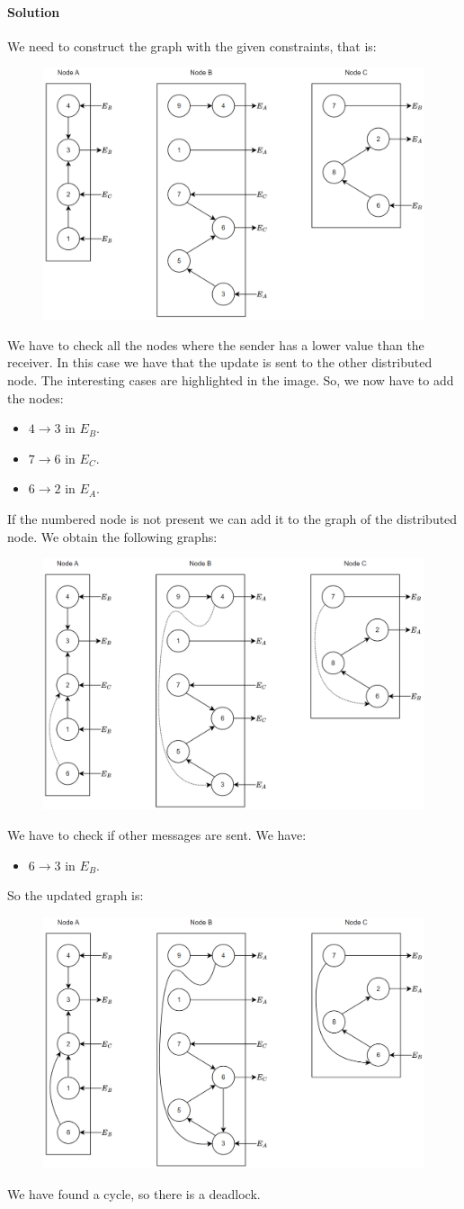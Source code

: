 \paragraph*{Solution}
We need to construct the graph with the given constraints, that is: 
\begin{figure}[H]
    \centering
    \includegraphics[width=0.6\linewidth]{images/Ob1.png}
\end{figure}
We have to check all the nodes where the sender has a lower value than the receiver. In this case we have that the update is sent to the 
other distributed node. The interesting cases are highlighted in the image. So, we now have to add the nodes: 
\begin{itemize}
    \item $4 \rightarrow 3$ in $E_B$. 
    \item $7 \rightarrow 6$ in $E_C$. 
    \item $6 \rightarrow 2$ in $E_A$. 
\end{itemize}
If the numbered node is not present we can add it to the graph of the distributed node. We obtain the following graphs: 
\begin{figure}[H]
    \centering
    \includegraphics[width=0.6\linewidth]{images/Ob2.png}
\end{figure}
We have to check if other messages are sent. We have:
\begin{itemize}
    \item $6 \rightarrow 3$ in $E_B$. 
\end{itemize}
So the updated graph is: 
\begin{figure}[H]
    \centering
    \includegraphics[width=0.6\linewidth]{images/Ob3.png}
\end{figure}
We have found a cycle, so there is a deadlock. 